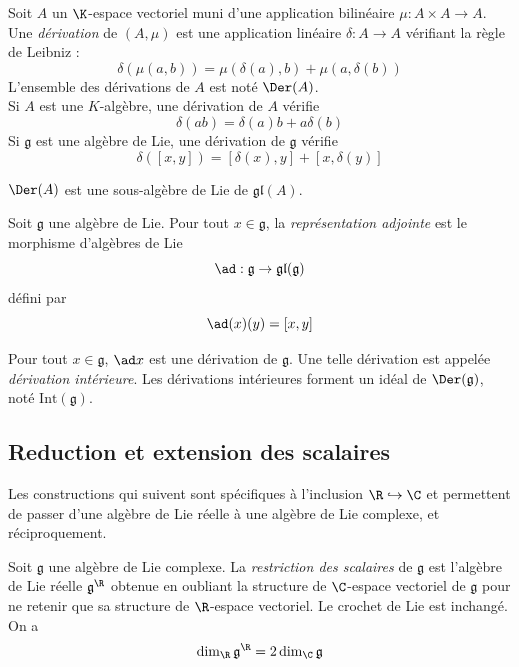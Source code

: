 \begin{definition}
    Soit $A$ un $\K$-espace vectoriel muni d'une application bilinéaire $\mu : A \times A \to A$. Une \emph{dérivation} de $(A, \mu)$ est une application linéaire $\delta : A \to A$ vérifiant la règle de Leibniz :
    $$\delta(\mu(a,b)) = \mu(\delta(a), b) + \mu(a, \delta(b))$$
    L'ensemble des dérivations de $A$ est noté $\Der(A)$. \\
    Si $A$ est une $K$-algèbre, une dérivation de $A$ vérifie $$\delta(ab) = \delta(a)b + a\delta(b)$$
    Si $\mathfrak{g}$ est une algèbre de Lie, une dérivation de $\mathfrak{g}$ vérifie 
    $$\delta([x,y]) = [\delta(x), y] + [x, \delta(y)]$$
\end{definition}

\begin{proposition}
    $\Der(A)$ est une sous-algèbre de Lie de $\mathfrak{gl}(A)$.
\end{proposition}

\omitted

\begin{definition}
    Soit $\mathfrak{g}$ une algèbre de Lie. Pour tout $x \in \mathfrak{g}$, la \emph{représentation adjointe} est le morphisme d'algèbres de Lie
    $$\ad : \mathfrak{g} \to \mathfrak{gl}(\mathfrak{g})$$
    défini par 
    $$\ad(x)(y) = [x, y]$$
\end{definition}

\begin{proposition}
    Pour tout $x \in \mathfrak{g}$, $\ad x$ est une dérivation de $\mathfrak{g}$. Une telle dérivation est appelée \emph{dérivation intérieure}. Les dérivations intérieures forment un idéal de $\Der(\mathfrak{g})$, noté $\mathrm{Int}(\mathfrak{g})$.
\end{proposition}

\omitted

\subsection{Reduction et extension des scalaires}

\noindent
Les constructions qui suivent sont spécifiques à l'inclusion $\R \hookrightarrow \C$ et permettent de passer d'une algèbre de Lie réelle à une algèbre de Lie complexe, et réciproquement.

\begin{definition}
    Soit $\mathfrak{g}$ une algèbre de Lie complexe. La \emph{restriction des scalaires} de $\mathfrak{g}$ est l'algèbre de Lie réelle $\mathfrak{g}^{\R}$ obtenue en oubliant la structure de $\C$-espace vectoriel de $\mathfrak{g}$ pour ne retenir que sa structure de $\R$-espace vectoriel. Le crochet de Lie est inchangé. On a
    $$\dim_{\R} \mathfrak{g}^{\R} = 2 \dim_{\C} \mathfrak{g}$$
\end{definition}

